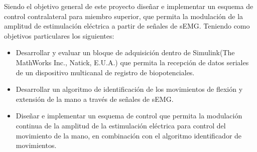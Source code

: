 


Siendo el objetivo general de este proyecto diseñar e implementar un esquema de control contralateral para miembro superior, que permita la modulación de la amplitud de estimulación eléctrica a partir de señales de sEMG. Teniendo como objetivos particulares los siguientes:

\begin{itemize}
	\item Desarrollar y evaluar un bloque de adquisición dentro de Simulink\textregistered  (The MathWorks Inc., Natick, E.U.A.) que permita la recepción de datos seriales de un dispositivo multicanal de registro de biopotenciales.
	\item Desarrollar un algoritmo de identificación de los movimientos de flexión y extensión de la mano a través de señales de sEMG.
	\item Diseñar e implementar un esquema de control que permita la modulación continua de la amplitud de la estimulación eléctrica para control del movimiento de la mano, en combinación con el algoritmo identificador de movimientos.
\end{itemize}
